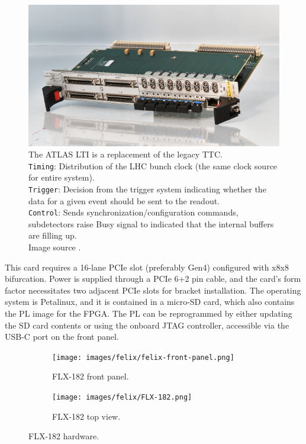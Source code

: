 \begin{figure}[htbp]
\centering
\includegraphics[width=\textwidth]{images/felix/lti.jpg}
\caption[LTI]{The ATLAS \acf{LTI} is a replacement of the legacy \acf{TTC}.\\ \texttt{Timing}: Distribution of the \acs{LHC} bunch clock (the same clock source for entire system).\\\texttt{Trigger}: Decision from the trigger system indicating whether the data for a given event should be sent to the readout.\\ \texttt{Control}: Sends synchronization/configuration commands, subdetectors raise Busy signal to indicated that the internal buffers are filling up.\\Image source \protect\cite{lti}.}
\label{fig:LTI}
\end{figure}

This card requires a 16-lane \acs{PCIe} slot (preferably Gen4) configured with x8x8 bifurcation. Power is supplied through a \acs{PCIe} 6+2 pin cable, and the card's form factor necessitates two adjacent \acs{PCIe} slots for bracket installation. The operating system is Petalinux, and it is contained in a micro-SD card, which also contains the \acl{PL} image for the \acs{FPGA}. The \acs{PL} can be reprogrammed by either updating the SD card contents or using the onboard \ac{JTAG} controller, accessible via the USB-C port on the front panel.

\begin{figure}[H]
\centering
\begin{subfigure}[b]{0.48\textwidth}
    \centering
    \texttt{[image: images/felix/felix-front-panel.png]}
    \caption{FLX-182 front panel.}
    \label{fig:FLX-182-panel}
\end{subfigure}
\hfill
\begin{subfigure}[b]{0.48\textwidth}
    \centering
    \texttt{[image: images/felix/FLX-182.png]}
    \caption{FLX-182 top view.}
    \label{fig:FLX-182}
\end{subfigure}
\caption{FLX-182 hardware.}
\label{fig:FLX-182-combined}
\end{figure}

